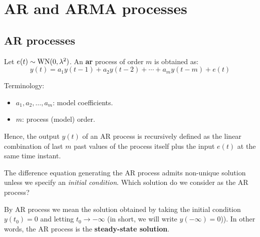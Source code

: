 \section{AR and ARMA processes}

\subsection{AR processes}

\begin{defn}
	Let $e(t) \sim \operatorname{WN}(0, \lambda^{2})$. An \textbf{\gls{ar}} process of order $m$ is obtained as:
	\[
		\boxed{y(t)=a_{1} y(t-1)+a_{2} y(t-2)+\cdots+a_{m} y(t-m)+e(t)}
	\]
\end{defn}

Terminology:
\begin{itemize}
	\item $a_{1}, a_{2}, \ldots, a_{m}$: model coefficients.
	\item $m$: process (model) order.
\end{itemize}
 
Hence, the output $y(t)$ of an AR process is recursively defined as the linear combination of last $m$ past values of the process itself plus the input $e(t)$ at the same time instant.

\begin{rem}
The difference equation generating the AR process admits non-unique solution unless we specify an \emph{initial condition}. Which solution do we consider as the AR process?

By AR process we mean the solution obtained by taking the initial condition $\boxed{y(t_{0})=0}$ and letting $t_{0} \to -\infty$ (in short, we will write $y(-\infty)=0$)). In other words, the AR process is the \textbf{steady-state solution}.
\end{rem}

